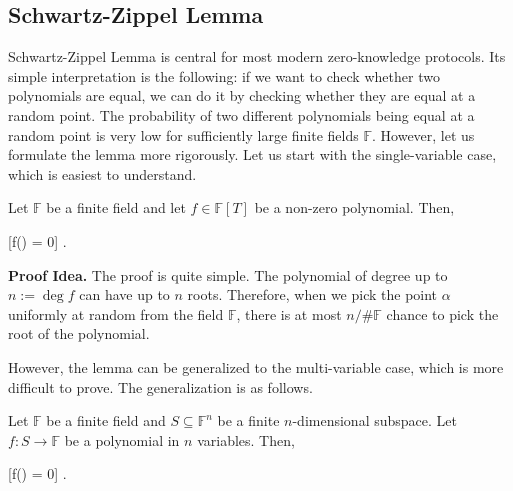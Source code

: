 \documentclass[../../book.tex]{subfiles}
\begin{document}
\subsection{Schwartz-Zippel Lemma}

Schwartz-Zippel Lemma is central for most modern zero-knowledge protocols. Its
simple interpretation is the following: if we want to check whether two
polynomials are equal, we can do it by checking whether they are equal at a
random point. The probability of two different polynomials being equal at a
random point is very low for sufficiently large finite fields $\mathbb{F}$.
However, let us formulate the lemma more rigorously. Let us start with the
single-variable case, which is easiest to understand.

\vspace{-0.6mm}

\begin{lemma}\label{lemma:one-sz} Let
    $\mathbb{F}$ be a finite field and let $f \in \mathbb{F}[T]$ be a non-zero
    polynomial. Then,
    \begin{xequation}
        [f(\alpha) = 0] \leq {}.
    \end{xequation}
\end{lemma}

\vspace{-0.6mm}

\textbf{Proof Idea.} The proof is quite simple. The polynomial of degree up to
$n:=\deg f$ can have up to $n$ roots. Therefore, when we pick the point $\alpha$
uniformly at random from the field $\mathbb{F}$, there is at most $n/\#\mathbb{F}$
chance to pick the root of the polynomial.

However, the lemma can be generalized to the multi-variable case, which is more
difficult to prove. The generalization is as follows.

\vspace{-0.6mm}

\begin{lemma}\label{lemma:sz} 
    Let $\mathbb{F}$ be a finite field and $S \subseteq \mathbb{F}^n$ be a finite
    $n$-dimensional subspace. Let $f: S \to \mathbb{F}$ be a polynomial
    in $n$ variables. Then,
    
    \vspace{-1.1mm}
    
    \begin{xequation}
        [f(\bm{\alpha}) = 0] \leq {}.
    \end{xequation}
\end{lemma}
\end{document}
